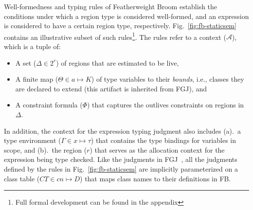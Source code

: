 \documentclass[a4paper,UKenglish]{lipics-v2018}
\newcommand{\env}[0]{\Gamma}
\newcommand{\fbname}{{\sc Featherweight Broom}\xspace}
\newcommand{\FB}{{\sc FB}\xspace}
\newcommand{\rgn}{r}
\newcommand{\tyvar}{a}
\newcommand{\fgjN}{K}
\newcommand{\rhoenv}{\Delta}
\newcommand{\aenv}{\Theta}
\newcommand{\phicx}{\Phi}
\newcommand{\A}{{\mathcal{A}}}
\begin{document}
Well-formedness and typing rules of \fbname establish the conditions
under which a region type is considered well-formed, and an expression
is considered to have a certain region type, respectively.
Fig.~\ref{fig:fb-staticsem} contains an illustrative subset of such
rules\footnote{Full formal development can be found in the
appendix}. The rules refer to a context ($\A$), which is a tuple of:
\begin{itemize}
  \item A set ($\rhoenv \in 2^\rgn$) of regions that are estimated to be
  live,
  \item A finite map ($\aenv \in \tyvar \mapsto \fgjN$) of type
  variables to their \emph{bounds}, i.e., classes they are declared to
  extend (this artifact is inherited from FGJ), and
  \item A constraint formula ($\phicx$) that captures the outlives
  constraints on regions in $\rhoenv$.
\end{itemize}
In addition, the context for the expression typing judgment also
includes (a).~a type environment ($\env \in x \mapsto \tau$) that
contains the type bindings for variables in scope, and (b).~the region
($\rgn$) that serves as the allocation context for the expression
being type checked. Like the judgments in FGJ~\cite{fgj}, all the
judgments defined by the rules in Fig.~\ref{fig:fb-staticsem} are
implicitly parameterized on a class table ($CT \in cn \mapsto D$) that
maps class names to their definitions in \FB.
\end{document}
